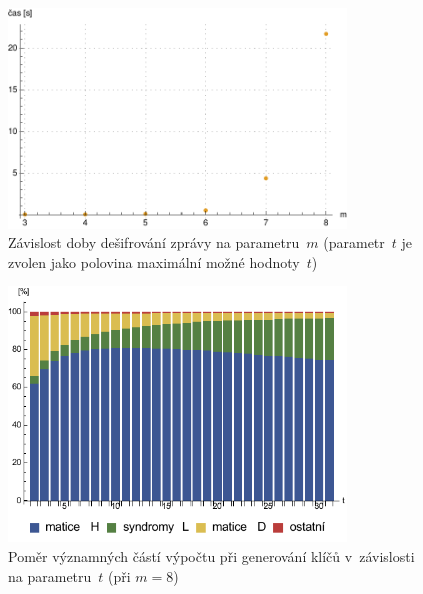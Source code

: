 \documentclass[thesis=M,czech,hidelinks]{FITthesis}[2012/06/26]
\newcommand{\0}{{\textcolor[gray]{0.75}{0}}}
\begin{document}
\begin{figure}[!ht]
    \centering
    \includegraphics[width=0.8\textwidth]{../implementace/grafy/listplot_tPul_desifrovani.pdf}
    \caption[Časová složitost dešifrování]{
        Závislost doby dešifrování zprávy na parametru~$m$
        (parametr~$t$ je zvolen jako polovina maximální možné hodnoty~$t$)
    }
    \label{obr_mereni_m_desifr}
\end{figure}


\begin{figure}[!ht]
    \centering
    \includegraphics[width=0.8\textwidth]{../implementace/grafy/chart_m8_generovani.pdf}
    \caption[Poměr částí výpočtu při generování klíčů]{
        Poměr významných částí výpočtu při generování klíčů v~závislosti na
        parametru~$t$ (při $m=8$)
    }
    \label{obr_mereni_pomer_gen}
\end{figure}
\end{document}
